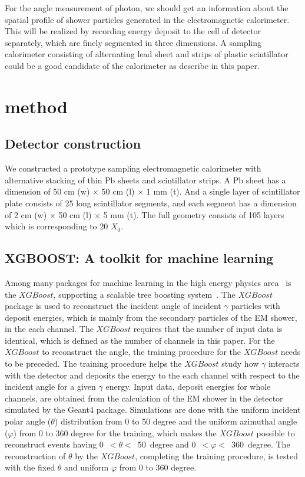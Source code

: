 \documentclass[jkps,preprint,fleqn,showpacs,showkeys]{revtex4}
\newcommand{\XGB}{XGBoost}
\begin{document}
For the angle measurement of photon, we should get an information about the spatial profile of shower particles generated in the electromagnetic calorimeter. This will be realized by recording energy deposit to the cell of detector separately, which are finely segmented in three dimensions. 
A sampling calorimeter consisting of alternating lead sheet and strips of plastic scintillator could be a good candidate of the calorimeter as describe in this paper.



\section{method}
\label{sec:ana}
\subsection{Detector construction}
We constructed a prototype sampling electromagnetic calorimeter with alternative stacking of thin Pb sheets and scintillator strips. A Pb sheet has a dimension of 50 cm (w) $\times$ 50 cm (l) $\times$ 1 mm (t). And a single layer of scintillator plate consists of 25 long scintillator segments, and each segment has a dimension of 2 cm (w) $\times$ 50 cm (l) $\times$ 5 mm (t). The full geometry consists of 105 layers  which is corresponding to 20 $X_0$. 



\subsection{XGBOOST: A toolkit for machine learning}
\label{sec:anaML}
Among many packages for machine learning in the high energy physics area~\cite{ATLAS:2020iwa} is the $\XGB$, supporting a scalable tree boosting system~\cite{xgboost:2016}. The $\XGB$ package is used to reconstruct the incident angle of incident $\gamma$ particles with deposit energies, which is mainly from the secondary particles of the EM shower, in the each channel. The $\XGB$ requires that the number of input data is identical, which is defined as the number of channels in this paper. For the $\XGB$ to reconstruct the angle, the training procedure for the $\XGB$ needs to be preceded. The training procedure helps the $\XGB$ study how $\gamma$ interacts with the detector and deposits the energy to the each channel with respect to the incident angle for a given $\gamma$ energy. Input data, deposit energies for whole channels, are obtained from the calculation of the EM shower in the detector simulated by the Geant4 package. Simulations are done with the uniform incident polar angle ($\theta$) distribution from 0 to 50 degree and the uniform azimuthal angle ($\varphi$) from 0 to 360 degree for the training, which makes the $\XGB$ possible to reconstruct events having 0~$<\theta<$~50~degree and 0~$<\varphi<$~360~degree. The reconstruction of $\theta$ by the $\XGB$, completing the training procedure, is tested with the fixed $\theta$ and uniform $\varphi$ from 0 to 360 degree.
\end{document}

